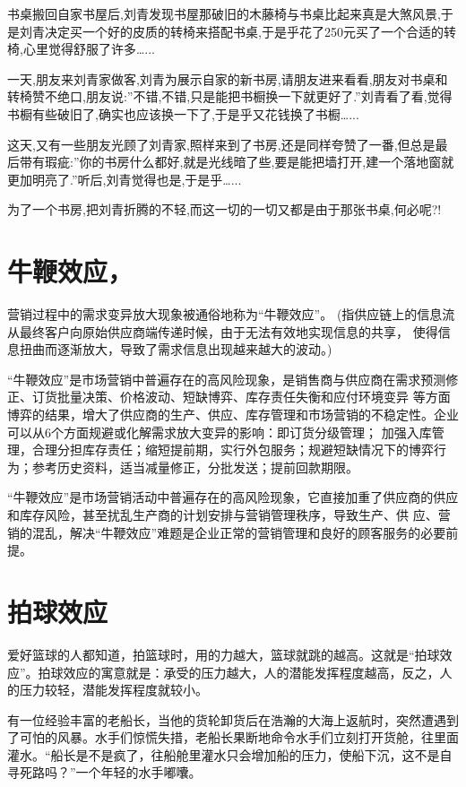 \documentclass[11pt]{ctexart}
\begin{document}
书桌搬回自家书屋后,刘青发现书屋那破旧的木藤椅与书桌比起来真是大煞风景,于是刘青决定买一个好的皮质的转椅来搭配书桌,于是乎花了250元买了一个合适的转椅,心里觉得舒服了许多\ldots{}...

一天,朋友来刘青家做客,刘青为展示自家的新书房,请朋友进来看看,朋友对书桌和转椅赞不绝口,朋友说:''不错,不错,只是能把书橱换一下就更好了.''刘青看了看,觉得书橱有些破旧了,确实也应该换一下了,于是乎又花钱换了书橱\ldots{}...

这天,又有一些朋友光顾了刘青家,照样来到了书房,还是同样夸赞了一番,但总是最后带有瑕疵:''你的书房什么都好,就是光线暗了些,要是能把墙打开,建一个落地窗就更加明亮了.''听后,刘青觉得也是,于是乎\ldots{}...

为了一个书房,把刘青折腾的不轻,而这一切的一切又都是由于那张书桌,何必呢?!
\section{牛鞭效应，}
\label{sec-75}


营销过程中的需求变异放大现象被通俗地称为“牛鞭效应”。 (指供应链上的信息流从最终客户向原始供应商端传递时候，由于无法有效地实现信息的共享，
使得信息扭曲而逐渐放大，导致了需求信息出现越来越大的波动。)

“牛鞭效应”是市场营销中普遍存在的高风险现象，是销售商与供应商在需求预测修正、订货批量决策、价格波动、短缺博弈、库存责任失衡和应付环境变异
等方面博弈的结果，增大了供应商的生产、供应、库存管理和市场营销的不稳定性。企业可以从6个方面规避或化解需求放大变异的影响：即订货分级管理；
加强入库管理，合理分担库存责任；缩短提前期，实行外包服务；规避短缺情况下的博弈行为；参考历史资料，适当减量修正，分批发送；提前回款期限。

“牛鞭效应”是市场营销活动中普遍存在的高风险现象，它直接加重了供应商的供应和库存风险，甚至扰乱生产商的计划安排与营销管理秩序，导致生产、供
应、营销的混乱，解决“牛鞭效应”难题是企业正常的营销管理和良好的顾客服务的必要前提。
\section{拍球效应}
\label{sec-76}


爱好篮球的人都知道，拍篮球时，用的力越大，篮球就跳的越高。这就是“拍球效应”。拍球效应的寓意就是：承受的压力越大，人的潜能发挥程度越高，反之，人的压力较轻，潜能发挥程度就较小。

有一位经验丰富的老船长，当他的货轮卸货后在浩瀚的大海上返航时，突然遭遇到了可怕的风暴。水手们惊慌失措，老船长果断地命令水手们立刻打开货舱，往里面灌水。“船长是不是疯了，往船舱里灌水只会增加船的压力，使船下沉，这不是自寻死路吗？”一个年轻的水手嘟囔。
\end{document}
